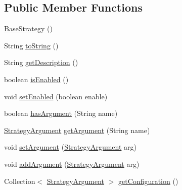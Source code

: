 \subsection*{Public Member Functions}
\begin{DoxyCompactItemize}
\item 
\hyperlink{classch_1_1zhaw_1_1ba10__bsha__1_1_1strategies_1_1BaseStrategy_a22dc9cd6d939460308ad8d065e4ec646}{BaseStrategy} ()
\item 
String \hyperlink{classch_1_1zhaw_1_1ba10__bsha__1_1_1strategies_1_1BaseStrategy_adfb24fbd69261e8567269c5d59365e46}{toString} ()
\item 
String \hyperlink{classch_1_1zhaw_1_1ba10__bsha__1_1_1strategies_1_1BaseStrategy_a56e779e4ce93ac1570b34bcde23e7455}{getDescription} ()
\item 
boolean \hyperlink{classch_1_1zhaw_1_1ba10__bsha__1_1_1strategies_1_1BaseStrategy_ad8e0e57f59a0ca49b27f205a39f2b8ae}{isEnabled} ()
\item 
void \hyperlink{classch_1_1zhaw_1_1ba10__bsha__1_1_1strategies_1_1BaseStrategy_acfeb454c9eda3e3279c75ce8101d980c}{setEnabled} (boolean enable)
\item 
boolean \hyperlink{classch_1_1zhaw_1_1ba10__bsha__1_1_1strategies_1_1BaseStrategy_a468d38d65e49d18ced35a34962e3f667}{hasArgument} (String name)
\item 
\hyperlink{classch_1_1zhaw_1_1ba10__bsha__1_1_1StrategyArgument}{StrategyArgument} \hyperlink{classch_1_1zhaw_1_1ba10__bsha__1_1_1strategies_1_1BaseStrategy_a8c113a7ead0de41b8dbd5e58d66de08e}{getArgument} (String name)
\item 
void \hyperlink{classch_1_1zhaw_1_1ba10__bsha__1_1_1strategies_1_1BaseStrategy_ad1b20c8f3f41126c9e6cef52d3f30bbe}{setArgument} (\hyperlink{classch_1_1zhaw_1_1ba10__bsha__1_1_1StrategyArgument}{StrategyArgument} arg)
\item 
void \hyperlink{classch_1_1zhaw_1_1ba10__bsha__1_1_1strategies_1_1BaseStrategy_ad106d9d501550fe475a4a01032632597}{addArgument} (\hyperlink{classch_1_1zhaw_1_1ba10__bsha__1_1_1StrategyArgument}{StrategyArgument} arg)
\item 
Collection$<$ \hyperlink{classch_1_1zhaw_1_1ba10__bsha__1_1_1StrategyArgument}{StrategyArgument} $>$ \hyperlink{classch_1_1zhaw_1_1ba10__bsha__1_1_1strategies_1_1BaseStrategy_a38329740106081e084162fb2e2c25f07}{getConfiguration} ()
\end{DoxyCompactItemize}
